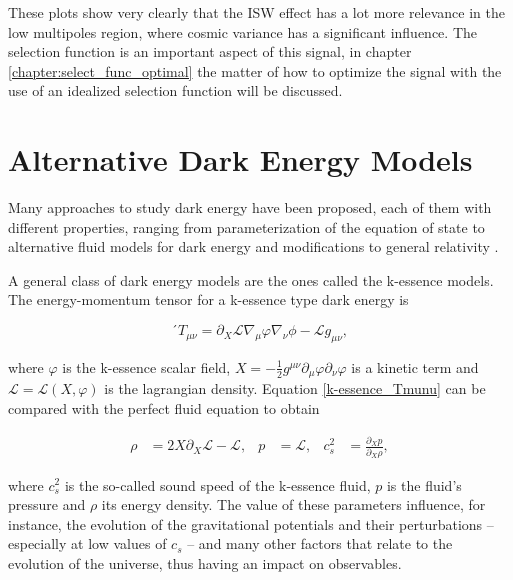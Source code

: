 \documentclass[openany,a4paper,12pt,oneside]{book}
\begin{document}
\begin{spacing}{1.5}
These plots show very clearly that the ISW effect has a lot more relevance in the low multipoles region, where cosmic variance has a significant influence. The selection function is an important aspect of this signal, in chapter \ref{chapter:select_func_optimal} the matter of how to optimize the signal with the use of an idealized selection function will be discussed.

\section{Alternative Dark Energy Models}\label{sect:dark_energy}

Many approaches to study dark energy have been proposed, each of them with different properties, ranging from parameterization of the equation of state \cite{CPL_DE_parametrization, FSLL_DE_parametrization} to alternative fluid models for dark energy \cite{DEDM_fluid, review_DE_ronaldo} and modifications to general relativity \cite{Brane_cosmo_model}. 

A general class of dark energy models are the ones called the k-essence models. The energy-momentum tensor for a k-essence type dark energy is \cite{review_DE_ronaldo}

\begin{equation}\label{k-essence_Tmunu}
´	T_{\mu\nu}=\partial_X \mathcal{L} \nabla_\mu \varphi \nabla_\nu \phi -\mathcal{L} g_{\mu\nu},
\end{equation}

\noindent where $\varphi$ is the k-essence scalar field, $X=-\frac{1}{2}g^{\mu\nu}\partial_\mu \varphi \partial_\nu \varphi$ is a kinetic term and $\mathcal{L}=\mathcal{L}(X, \varphi)$ is the lagrangian density. Equation \eqref{k-essence_Tmunu} can be compared with the perfect fluid equation to obtain

\begin{align}\label{k-essence_results}
	\rho&=2X\partial_X\mathcal{L}-\mathcal{L}, & p&=\mathcal{L}, & c_s^2&=\frac{\partial_X p}{\partial_X \rho},
\end{align}

\noindent where $c_s^2$ is the so-called sound speed of the k-essence fluid, $p$ is the fluid's pressure and $\rho$ its energy density. The value of these parameters influence, for instance, the evolution of the gravitational potentials \cite{DE_variable_soundspeed_Linton2018} and their perturbations -- especially at low values of $c_s$ -- and many other factors that relate to the evolution of the universe, thus having an impact on observables. 


\end{spacing}
\end{document}
